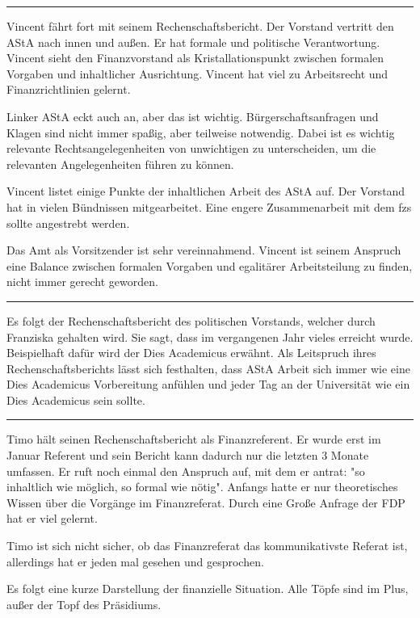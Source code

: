 \documentclass[ngerman,headheight=70pt]{scrartcl}
\begin{document}
    \hrule

    Vincent fährt fort mit seinem Rechenschaftsbericht.
    Der Vorstand vertritt den AStA nach innen und außen. Er hat formale und
    politische Verantwortung. Vincent sieht den Finanzvorstand als Kristallationspunkt
    zwischen formalen Vorgaben und inhaltlicher Ausrichtung. Vincent hat viel
    zu Arbeitsrecht und Finanzrichtlinien gelernt.

    Linker AStA eckt auch an, aber das ist wichtig. Bürgerschaftsanfragen und
    Klagen sind nicht immer spaßig, aber teilweise notwendig. Dabei ist es wichtig
    relevante Rechtsangelegenheiten von unwichtigen zu unterscheiden, um die
    relevanten Angelegenheiten führen zu können.

    Vincent listet einige Punkte der inhaltlichen Arbeit des AStA auf. Der Vorstand
    hat in vielen Bündnissen mitgearbeitet. Eine engere Zusammenarbeit mit dem fzs
    sollte angestrebt werden.

    Das Amt als Vorsitzender ist sehr vereinnahmend. Vincent ist seinem Anspruch
    eine Balance zwischen formalen Vorgaben und egalitärer Arbeitsteilung zu finden,
    nicht immer gerecht geworden.

    \hrule

    Es folgt der Rechenschaftsbericht des politischen Vorstands, welcher durch
    Franziska gehalten wird. Sie sagt, dass im vergangenen Jahr vieles
    erreicht wurde. Beispielhaft dafür wird der Dies Academicus erwähnt.
    Als Leitspruch ihres Rechenschaftsberichts lässt sich festhalten,
    dass AStA Arbeit sich immer wie eine Dies Academicus Vorbereitung anfühlen
    und jeder Tag an der Universität wie ein Dies Academicus sein sollte.

    \hrule

    Timo hält seinen Rechenschaftsbericht als Finanzreferent. Er wurde erst im
    Januar Referent und sein Bericht kann dadurch nur die letzten 3 Monate umfassen.
    Er ruft noch einmal den Anspruch auf, mit dem er antrat: "so inhaltlich wie
    möglich, so formal wie nötig". Anfangs hatte er nur theoretisches Wissen
    über die Vorgänge im Finanzreferat. Durch eine Große Anfrage der FDP hat
    er viel gelernt.

    Timo ist sich nicht sicher, ob das Finanzreferat das kommunikativste Referat
    ist, allerdings hat er jeden mal gesehen und gesprochen.

    Es folgt eine kurze Darstellung der finanzielle Situation. Alle Töpfe sind im
    Plus, außer der Topf des Präsidiums.
\end{document}
